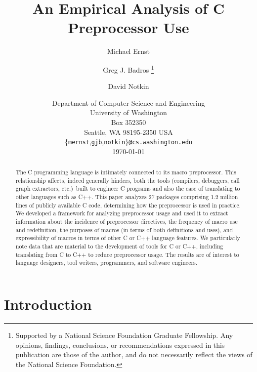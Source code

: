 \documentclass[11pt]{article}
\def\numpackages{27}
\def\numlines{1.2 million}
\begin{document}
% 


\title{An Empirical Analysis of C Preprocessor Use}

\author{Michael Ernst%
  \and Greg J. Badros%
  \thanks{Supported by a National Science Foundation
    Graduate Fellowship. Any opinions, findings, conclusions, or
    recommendations expressed in this publication are those of the
    author, and do not necessarily reflect the views of the National
    Science Foundation.}
  \and David Notkin}

\date{Department of Computer Science and Engineering \\
University of Washington \\
Box 352350 \\
Seattle, WA  98195-2350  USA \\
{\small \{{\tt mernst},{\tt gjb},{\tt notkin}\}{\tt @cs.washington.edu}} \\
\today}  

\maketitle

\begin{abstract}

  The C programming language is intimately connected to its macro
  preprocessor.  This relationship affects, indeed generally hinders, both
  the tools (compilers, debuggers, call graph extractors, etc.)\ built to
  engineer C programs and also the ease of translating to other languages
  such as C++.  This paper analyzes {\numpackages} packages comprising
  {\numlines} lines of publicly available C code, determining how
  the preprocessor is used in practice.  We developed a framework for
  analyzing preprocessor usage and used it to extract information about the
  incidence of preprocessor directives, the frequency of macro use and
  redefinition, the purposes of macros (in terms of both definitions and
  uses), and expressibility of macros in terms of other C or C++
  language features.  We particularly note
  data that are material to the development of tools for C or C++,
  including translating from C to C++ to reduce preprocessor usage.
  The results are of interest to language designers, tool writers,
  programmers, and software engineers.
\end{abstract}

\bigskip

\section{Introduction}
\end{document}
